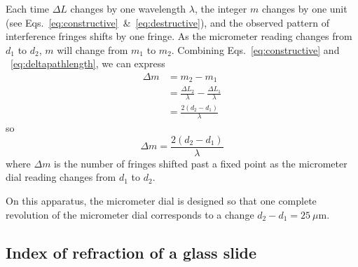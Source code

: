 Each time $\Delta L$ changes by one wavelength $\lambda$, the integer $m$ changes
by one unit (see Eqs.~\ref{eq:constructive}~\&~\ref{eq:destructive}), and the
observed pattern of interference fringes shifts by one fringe. As the micrometer
reading changes from $d_{1}$ to $d_{2}$, $m$ will change from $m_{1}$ to
$m_{2}$. Combining Eqs.~\ref{eq:constructive} and ~\ref{eq:deltapathlength}, we
can express 
\begin{align}
 \Delta m &= m_2 - m_1 \nonumber \\
 &= \frac{\Delta L_{2}}{\lambda} - \frac{\Delta L_{1}}{\lambda} \nonumber \\
 &= \frac{2(d_{2} - d_{1})} {\lambda} \nonumber
\end{align}
so
\begin{equation}
\boxed{\Delta m = \frac{2(d_{2} - d_{1})} {\lambda}}
\label{eq:delta-m}
\end{equation}
where $\Delta m$ is the number of fringes shifted past a fixed point as the
micrometer dial reading changes from $d_{1}$ to $d_{2}$. 

On this apparatus, the micrometer dial is designed so that one 
complete revolution of the micrometer dial corresponds to a change 
$d_{2} - d_{1} = 25~\mu$m.

%



\subsection{Index of refraction of a glass slide}

